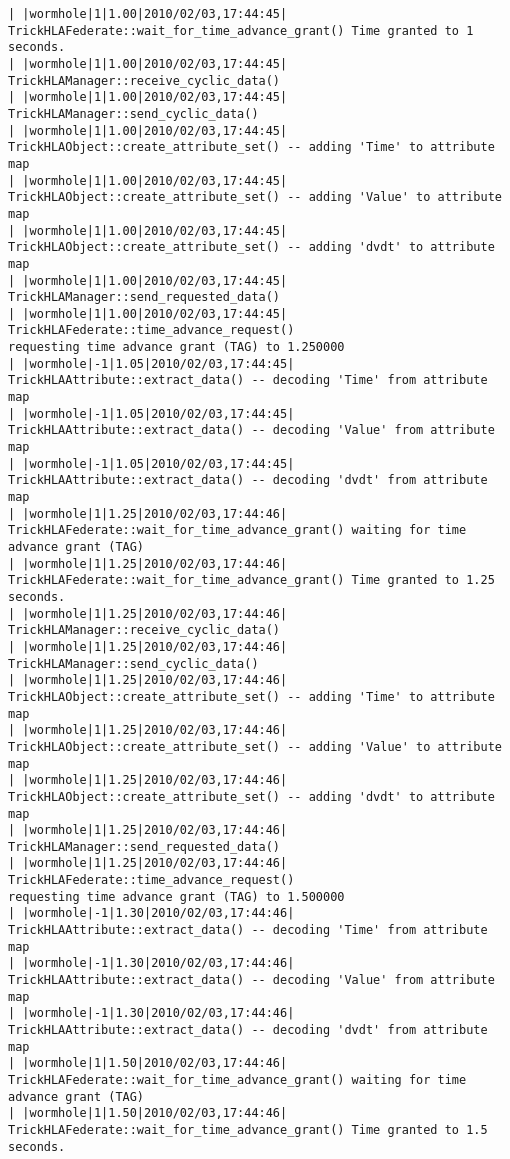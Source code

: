 \begin{lstlisting}[numbers=none,caption={output showing conditionally sent cyclic data}]
| |wormhole|1|1.00|2010/02/03,17:44:45| TrickHLAFederate::wait_for_time_advance_grant() Time granted to 1 seconds.
| |wormhole|1|1.00|2010/02/03,17:44:45| TrickHLAManager::receive_cyclic_data()
| |wormhole|1|1.00|2010/02/03,17:44:45| TrickHLAManager::send_cyclic_data()
| |wormhole|1|1.00|2010/02/03,17:44:45| TrickHLAObject::create_attribute_set() -- adding 'Time' to attribute map
| |wormhole|1|1.00|2010/02/03,17:44:45| TrickHLAObject::create_attribute_set() -- adding 'Value' to attribute map
| |wormhole|1|1.00|2010/02/03,17:44:45| TrickHLAObject::create_attribute_set() -- adding 'dvdt' to attribute map
| |wormhole|1|1.00|2010/02/03,17:44:45| TrickHLAManager::send_requested_data()
| |wormhole|1|1.00|2010/02/03,17:44:45| TrickHLAFederate::time_advance_request()   
requesting time advance grant (TAG) to 1.250000
| |wormhole|-1|1.05|2010/02/03,17:44:45| TrickHLAAttribute::extract_data() -- decoding 'Time' from attribute map
| |wormhole|-1|1.05|2010/02/03,17:44:45| TrickHLAAttribute::extract_data() -- decoding 'Value' from attribute map
| |wormhole|-1|1.05|2010/02/03,17:44:45| TrickHLAAttribute::extract_data() -- decoding 'dvdt' from attribute map
| |wormhole|1|1.25|2010/02/03,17:44:46| TrickHLAFederate::wait_for_time_advance_grant() waiting for time advance grant (TAG)
| |wormhole|1|1.25|2010/02/03,17:44:46| TrickHLAFederate::wait_for_time_advance_grant() Time granted to 1.25 seconds.
| |wormhole|1|1.25|2010/02/03,17:44:46| TrickHLAManager::receive_cyclic_data()
| |wormhole|1|1.25|2010/02/03,17:44:46| TrickHLAManager::send_cyclic_data()
| |wormhole|1|1.25|2010/02/03,17:44:46| TrickHLAObject::create_attribute_set() -- adding 'Time' to attribute map
| |wormhole|1|1.25|2010/02/03,17:44:46| TrickHLAObject::create_attribute_set() -- adding 'Value' to attribute map
| |wormhole|1|1.25|2010/02/03,17:44:46| TrickHLAObject::create_attribute_set() -- adding 'dvdt' to attribute map
| |wormhole|1|1.25|2010/02/03,17:44:46| TrickHLAManager::send_requested_data()
| |wormhole|1|1.25|2010/02/03,17:44:46| TrickHLAFederate::time_advance_request()   
requesting time advance grant (TAG) to 1.500000
| |wormhole|-1|1.30|2010/02/03,17:44:46| TrickHLAAttribute::extract_data() -- decoding 'Time' from attribute map
| |wormhole|-1|1.30|2010/02/03,17:44:46| TrickHLAAttribute::extract_data() -- decoding 'Value' from attribute map
| |wormhole|-1|1.30|2010/02/03,17:44:46| TrickHLAAttribute::extract_data() -- decoding 'dvdt' from attribute map
| |wormhole|1|1.50|2010/02/03,17:44:46| TrickHLAFederate::wait_for_time_advance_grant() waiting for time advance grant (TAG)
| |wormhole|1|1.50|2010/02/03,17:44:46| TrickHLAFederate::wait_for_time_advance_grant() Time granted to 1.5 seconds.

\end{lstlisting}
